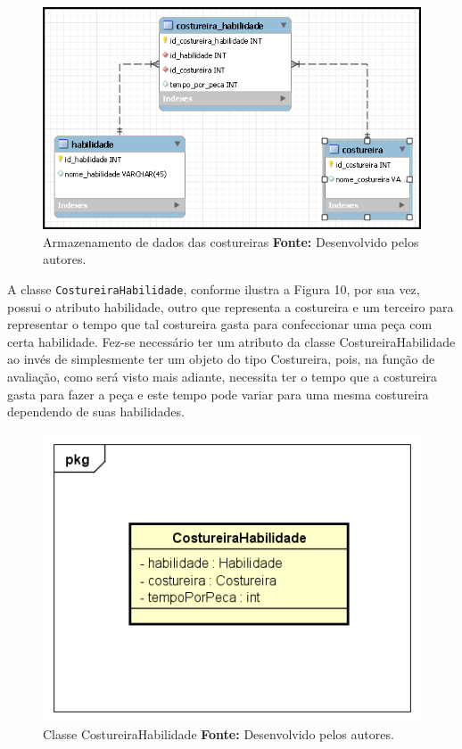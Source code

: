 \begin{figure}[h!]
	\centerline{\includegraphics[scale=0.6]{./imagens/costureira_habilidade_tabela.png}}
	\caption[Armazenamento de dados das costureiras]
	{Armazenamento de dados das costureiras \textbf{Fonte:} Desenvolvido pelos
	autores.}
	\label{fig:exemplo1}
\end{figure}


\par A classe \texttt{CostureiraHabilidade}, conforme ilustra a Figura 10, por
sua vez, possui o atributo habilidade, outro que
representa a costureira e um terceiro para representar o tempo que tal
costureira gasta para confeccionar uma peça com certa habilidade. Fez-se
necessário ter um atributo da classe CostureiraHabilidade ao invés de simplesmente ter um objeto do tipo Costureira, pois, 
na função de avaliação, como será visto mais adiante, necessita ter o tempo
que a costureira gasta para fazer a peça e este tempo pode variar para uma mesma costureira dependendo de suas habilidades.

\begin{figure}[h!]
	\centerline{\includegraphics[scale=0.9]{./imagens/costureiraHabilidade_class.png}}
	\caption[Classe CostureiraHabilidade]
	{Classe CostureiraHabilidade \textbf{Fonte:} Desenvolvido pelos autores.}
	\label{fig:exemplo1}
\end{figure}

